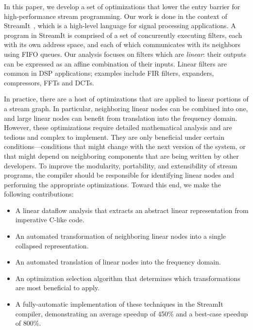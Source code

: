 In this paper, we develop a set of optimizations that lower the entry
barrier for high-performance stream programming.  Our work is done in
the context of StreamIt~\cite{streamit-asplos,streamitcc}, which is a
high-level language for signal processing applications.  A program in
StreamIt is comprised of a set of concurrently executing filters, each
with its own address space, and each of which communicates with its
neighbors using FIFO queues.  Our analysis focuses on filters which
are {\it linear}: their outputs can be expressed as
an affine combination of their inputs.  Linear filters are common in
DSP applications; examples include FIR filters, expanders,
compressors, FFTs and DCTs.

In practice, there are a host of optimizations that are applied to
linear portions of a stream graph.  In particular, neighboring linear
nodes can be combined into one, and large linear nodes can benefit
from translation into the frequency domain.  However, these
optimizations require detailed mathematical analysis and are tedious
and complex to implement.  They are only beneficial under certain
conditions---conditions that might change with the next version of the
system, or that might depend on neighboring components that are being
written by other developers.  To improve the modularity, portability,
and extensibility of stream programs, the compiler should be
responsible for identifying linear nodes and performing the
appropriate optimizations.  Toward this end, we make the following
contributions:
\begin{itemize}
\vspace{-6pt}

\item A linear dataflow analysis that extracts an abstract linear
representation from imperative C-like code.
\vspace{-6pt}

\item An automated transformation of neighboring linear nodes into a
single collapsed representation.
\vspace{-6pt}

\item An automated translation of linear nodes into the frequency
domain.
\vspace{-6pt}

\item An optimization selection algorithm that determines which
transformations are most beneficial to apply.
\vspace{-6pt}

\item A fully-automatic implementation of these techniques in the
StreamIt compiler, demonstrating an average speedup of 450\% and a
best-case speedup of 800\%.
\vspace{-6pt}

\end{itemize}
